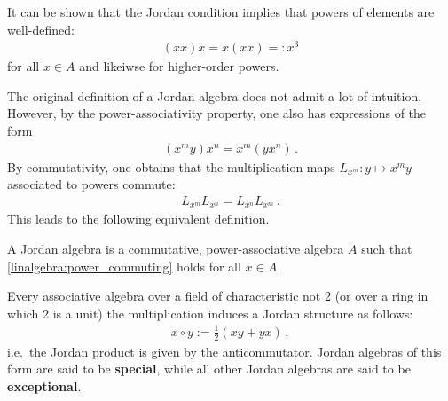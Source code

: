     \begin{property}
        It can be shown that the Jordan condition implies that powers of elements are well-defined:
        \begin{gather}
            (xx)x = x(xx) =: x^3
        \end{gather}
        for all $x\in A$ and likeiwse for higher-order powers.
    \end{property}

    The original definition of a Jordan algebra does not admit a lot of intuition. However, by the power-associativity property, one also has expressions of the form
    \begin{gather}
        (x^my)x^n = x^m(yx^n)\,.
    \end{gather}
    By commutativity, one obtains that the multiplication maps $L_{x^m}:y\mapsto x^my$ associated to powers commute:
    \begin{gather}
        \label{linalgebra:power_commuting}
        L_{x^m}L_{x^n} = L_{x^n}L_{x^m}\,.
    \end{gather}
    This leads to the following equivalent definition.
    \begin{adefinition}
        A Jordan algebra is a commutative, power-associative algebra $A$ such that \cref{linalgebra:power_commuting} holds for all $x\in A$.
    \end{adefinition}

    \begin{property}
        Every associative algebra over a field of characteristic not 2 (or over a ring in which 2 is a unit) the multiplication induces a Jordan structure as follows:
        \begin{gather}
            x\circ y := \frac{1}{2}(xy+yx)\,,
        \end{gather}
        i.e.~the Jordan product is given by the anticommutator. Jordan algebras of this form are said to be \textbf{special}, while all other Jordan algebras are said to be \textbf{exceptional}.
    \end{property}

